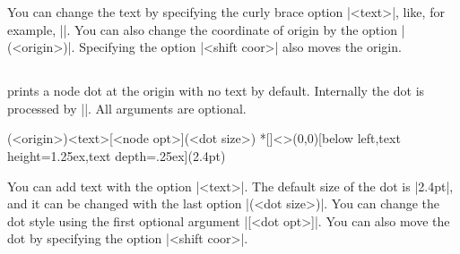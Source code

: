 \begin{tzcode}{.3}
{}
\end{tzcode}

You can change the text by specifying the curly brace option |{<text>}|, like, for example, ||.
You can also change the coordinate of origin by the option |(<origin>)|.
Specifying the option |<shift coor>| also moves the origin.


\begin{tzcode}{.3}
\end{tzcode}


\subsection{\protect\cmd{\tzshoworigin*}}
\label{ss:tzshoworigin*}


\icmd{\tzshoworigin*} prints a node dot at the origin with no text by default.
Internally the dot is processed by |\tzdot*|. All arguments are optional.

\begin{tzdef}{}
(<origin>){<text>}[<node opt>](<dot size>)
 *[]<>(0,0){}[below left,text height=1.25ex,text depth=.25ex](2.4pt)
\end{tzdef}

\begin{tzcode}{.3}
{}
\end{tzcode}

You can add text with the option |{<text>}|.
The default size of the dot is |2.4pt|, and it can be changed with the last option |(<dot size>)|. You can change the dot style using the first optional argument |[<dot opt>]|.
You can also move the dot by specifying the option |<shift coor>|.

\begin{tzcode}{.3}
{}
\end{tzcode}

